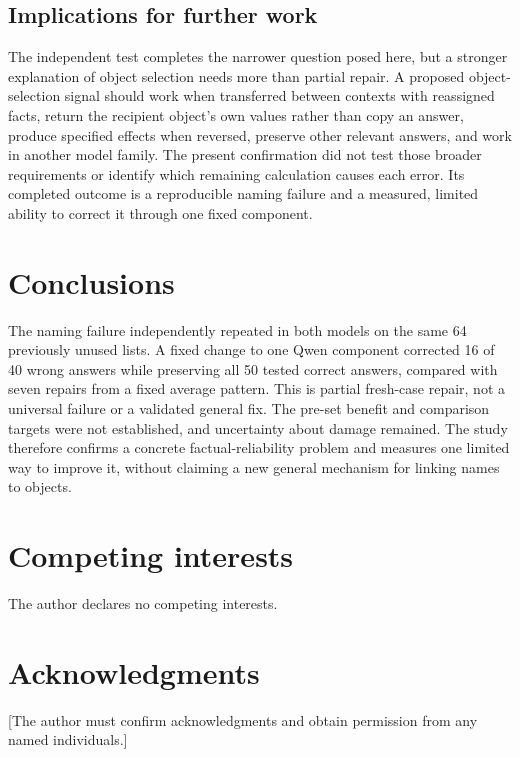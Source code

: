 \documentclass[10pt,letterpaper]{article}
\begin{document}
\subsection*{Implications for further work}

The independent test completes the narrower question posed here, but a stronger explanation of object selection needs more than partial repair. A proposed object-selection signal should work when transferred between contexts with reassigned facts, return the recipient object's own values rather than copy an answer, produce specified effects when reversed, preserve other relevant answers, and work in another model family. The present confirmation did not test those broader requirements or identify which remaining calculation causes each error. Its completed outcome is a reproducible naming failure and a measured, limited ability to correct it through one fixed component.


\section*{Conclusions}

The naming failure independently repeated in both models on the same 64 previously unused lists. A fixed change to one Qwen component corrected 16 of 40 wrong answers while preserving all 50 tested correct answers, compared with seven repairs from a fixed average pattern. This is partial fresh-case repair, not a universal failure or a validated general fix. The pre-set benefit and comparison targets were not established, and uncertainty about damage remained. The study therefore confirms a concrete factual-reliability problem and measures one limited way to improve it, without claiming a new general mechanism for linking names to objects.


\section*{Competing interests}

The author declares no competing interests.


\section*{Acknowledgments}

[The author must confirm acknowledgments and obtain permission from any named individuals.]
\end{document}
